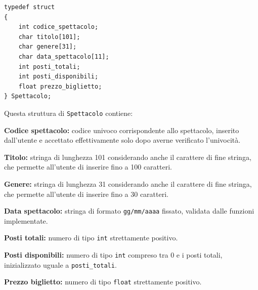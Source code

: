 \documentclass[11pt,a4paper,oneside,openany]{book}
\newenvironment{listacomp}{%
    \small
    \begin{list}{\textendash}{%
        \setlength{\topsep}{2pt}%
        \setlength{\partopsep}{0pt}%
        \setlength{\itemsep}{1pt}%
        \setlength{\parsep}{0pt}%
        \setlength{\leftmargin}{1.2em}%
    }%
}{%
    \end{list}%
}
\begin{document}
\begin{lstlisting}[caption={Definizione della struttura Spettacolo}]
typedef struct
{
    int codice_spettacolo;
    char titolo[101];
    char genere[31];
    char data_spettacolo[11];
    int posti_totali;
    int posti_disponibili;
    float prezzo_biglietto;
} Spettacolo;
\end{lstlisting}
Questa struttura di \texttt{Spettacolo} contiene:
\begin{listacomp}
    \item \textbf{Codice spettacolo:} codice univoco corrispondente allo spettacolo, inserito dall'utente e accettato effettivamente solo dopo averne verificato l'univocità.
    \item \textbf{Titolo:} stringa di lunghezza 101 considerando anche il carattere di fine stringa, che permette all'utente di inserire fino a 100 caratteri.
    \item \textbf{Genere:} stringa di lunghezza 31 considerando anche il carattere di fine stringa, che permette all'utente di inserire fino a 30 caratteri.
    \item \textbf{Data spettacolo:} stringa di formato \texttt{gg/mm/aaaa} fissato, validata dalle funzioni implementate.
    \item \textbf{Posti totali:} numero di tipo \texttt{int} strettamente positivo.
    \item \textbf{Posti disponibili:} numero di tipo \texttt{int} compreso tra 0 e i posti totali, inizializzato uguale a \texttt{posti\_totali}.
    \item \textbf{Prezzo biglietto:} numero di tipo \texttt{float} strettamente positivo.
\end{listacomp}
\end{document}
